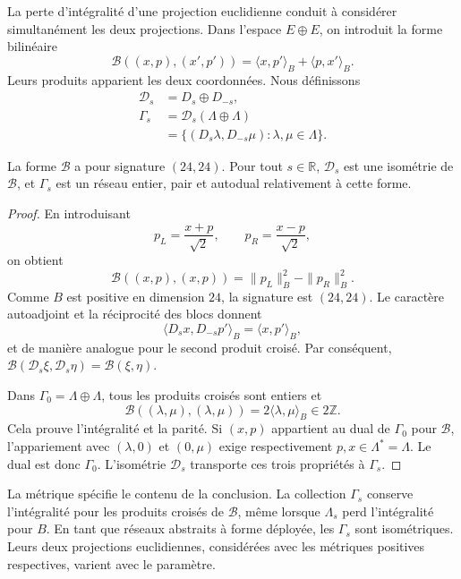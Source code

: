 La perte d’intégralité d’une projection euclidienne conduit à
considérer simultanément les deux projections. Dans l’espace
\(E\oplus E\), on introduit la forme bilinéaire
\begin{equation}
 \mathcal B((x,p),(x',p'))=
       \langle x,p'\rangle_B+\langle p,x'\rangle_B.
 \label{eq:leech-split-form}
\end{equation}
Leurs produits apparient les deux coordonnées. Nous définissons
\begin{equation}
\begin{split}
 \mathcal D_s&=D_s\oplus D_{-s},\\
 \Gamma_s&=\mathcal D_s(\Lambda\oplus\Lambda)\\
 &=\{(D_s\lambda,D_{-s}\mu):\lambda,\mu\in\Lambda\}.
\end{split}
\label{eq:leech-split-lattice}
\end{equation}

\begin{theorem}
\label{thm:leech-split}
La forme \(\mathcal B\) a pour signature \((24,24)\).
Pour tout \(s\in\mathbb R\), \(\mathcal D_s\) est une isométrie de
\(\mathcal B\), et \(\Gamma_s\) est un réseau entier, pair et autodual
relativement à cette forme.
\end{theorem}
\begin{proof}
En introduisant
\[
 p_L=\frac{x+p}{\sqrt2},\qquad
 p_R=\frac{x-p}{\sqrt2},
\]
on obtient
\[
 \mathcal B((x,p),(x,p))=\|p_L\|_B^2-\|p_R\|_B^2.
\]
Comme \(B\) est positive en dimension \(24\), la signature est \((24,24)\). Le caractère autoadjoint et la réciprocité des blocs donnent
\[
 \langle D_sx,D_{-s}p'\rangle_B=\langle x,p'\rangle_B,
\]
et de manière analogue pour le second produit croisé. Par conséquent,
\(\mathcal B(\mathcal D_s\xi,\mathcal D_s\eta)=\mathcal B(\xi,\eta)\).

Dans \(\Gamma_0=\Lambda\oplus\Lambda\), tous les produits croisés sont entiers et
\[
 \mathcal B((\lambda,\mu),(\lambda,\mu))
   =2\langle\lambda,\mu\rangle_B\in2\mathbb Z.
\]
Cela prouve l’intégralité et la parité. Si \((x,p)\) appartient au dual
de \(\Gamma_0\) pour \(\mathcal B\), l’appariement avec
\((\lambda,0)\) et \((0,\mu)\) exige respectivement
\(p,x\in\Lambda^*=\Lambda\). Le dual est donc \(\Gamma_0\).
L’isométrie \(\mathcal D_s\) transporte ces trois propriétés
à \(\Gamma_s\).
\end{proof}

La métrique spécifie le contenu de la conclusion. La collection \(\Gamma_s\) conserve l'intégralité pour les produits croisés de \(\mathcal B\), même lorsque \(\Lambda_s\) perd l'intégralité pour \(B\). En tant que réseaux abstraits à forme déployée, les \(\Gamma_s\) sont isométriques. Leurs deux projections euclidiennes, considérées avec les métriques positives respectives, varient avec le paramètre.

